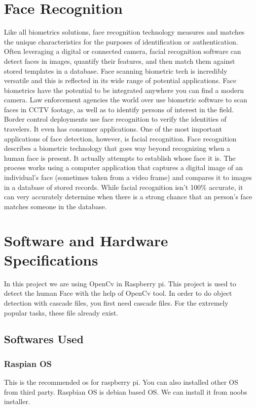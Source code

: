 \documentclass[sigconf]{acmart}
\begin{document}
\section{Face Recognition}
Like all biometrics solutions, face recognition technology measures and matches the unique characteristics for the purposes of identification or authentication. Often leveraging a digital or connected camera, facial recognition software can detect faces in images, quantify their features, and then match them against stored templates in a database.
Face scanning biometric tech is incredibly versatile and this is reflected in its wide range of potential applications.
Face biometrics have the potential to be integrated anywhere you can find a modern camera. Law enforcement agencies the world over use biometric software to scan faces in CCTV footage, as well as to identify persons of interest in the field. Border control deployments use face recognition to verify the identities of travelers. It even has consumer applications.
One of the most important applications of face detection, however, is facial recognition. Face recognition describes a biometric technology that goes way beyond recognizing when a human face is present. It actually attempts to establish whose face it is. The process works using a computer application that captures a digital image of an individual’s face (sometimes taken from a video frame) and compares it to images in a database of stored records. While facial recognition isn’t 100\% accurate, it can very accurately determine when there is a strong chance that an person’s face matches someone in the database.


\section{Software and Hardware Specifications}
In this project we are using OpenCv in Raspberry pi. This project is used to detect the human Face with the help of OpenCv tool. In order to do object detection with cascade files, you first need cascade files. For the extremely popular tasks, these file already exist.

\subsection{Softwares Used}

\subsubsection{Raspian OS}
This is the recommended os for raspberry pi. You can also installed other OS from third party. Raspbian OS is debian based OS. We can install it from noobs installer. 
\end{document}
